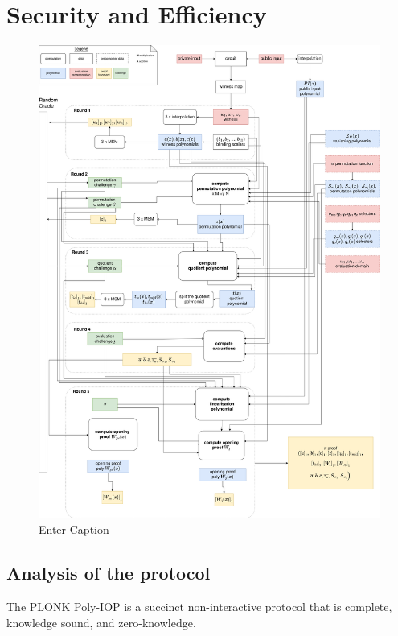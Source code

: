 \chapter{Security and Efficiency}
\label{Chapter4}

\begin{figure}
    \centering
    \includegraphics[width=1\linewidth]{round-figures/prover-algorithm.drawio.png}
    \caption{Enter Caption}
    \label{fig:enter-label}
\end{figure}


\section{Analysis of the protocol}

\begin{theorem}
    The PLONK Poly-IOP is a succinct non-interactive protocol that is complete, knowledge sound, and zero-knowledge.
\end{theorem}

